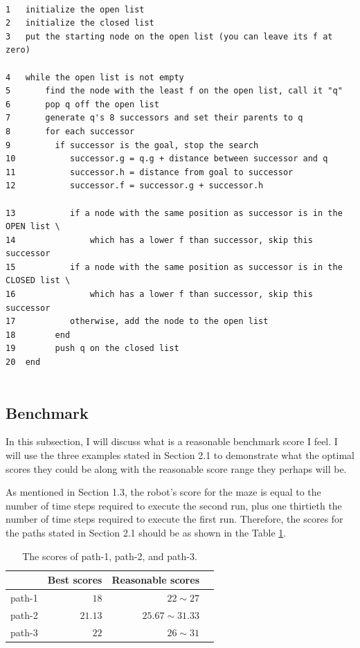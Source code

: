 \documentclass[11pt, oneside]{article}   	%
\begin{document}
\begin{verbatim}

1   initialize the open list
2   initialize the closed list
3   put the starting node on the open list (you can leave its f at zero)

4   while the open list is not empty
5       find the node with the least f on the open list, call it "q"
6       pop q off the open list
7       generate q's 8 successors and set their parents to q
8       for each successor
9         if successor is the goal, stop the search
10           successor.g = q.g + distance between successor and q
11           successor.h = distance from goal to successor
12           successor.f = successor.g + successor.h

13           if a node with the same position as successor is in the OPEN list \
14               which has a lower f than successor, skip this successor
15           if a node with the same position as successor is in the CLOSED list \ 
16               which has a lower f than successor, skip this successor
17           otherwise, add the node to the open list
18        end
19        push q on the closed list
20  end


\end{verbatim}







\subsection{Benchmark}
In this subsection, I will discuss what is a reasonable benchmark score I feel. I will use the three examples stated in Section 2.1 to demonstrate what the optimal scores they could be along with the reasonable score range they perhaps will be.

As mentioned in Section 1.3, the robot's score for the maze is equal to the number of time steps required to execute the second run, plus one thirtieth the number of time steps required to execute the first run. Therefore, the scores for the paths stated in Section 2.1 should be as shown in the Table \ref{Benchmark}.

\begin{table}[htp]
\caption{The scores of path-1, path-2, and path-3.}
\begin{center}
\begin{tabular}{ rrrr } 
\hline
 & Best scores & Reasonable scores \\
\hline
path-1 & $18$    & $22 \sim 27$ \\ 
path-2 & $21.13$ & $25.67 \sim 31.33$ \\ 
path-3 & $22$    & $26 \sim 31$ \\ 
\hline
\end{tabular}
\end{center}
\label{Benchmark}
\end{table}%
\end{document}
